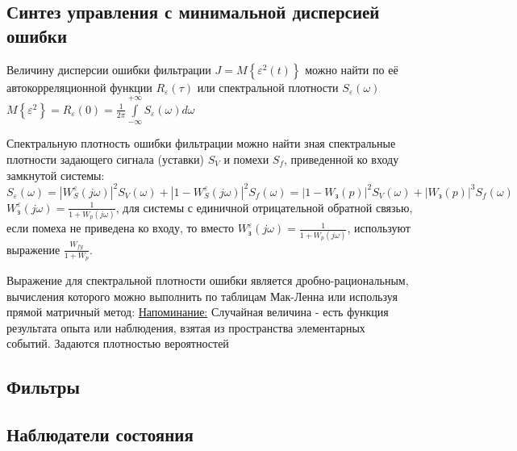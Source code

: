 \documentclass[preprint,russian,a5paper,10pt,twoside,mediummath]{ncc}
\begin{document}
\subsection{Синтез управления с минимальной дисперсией ошибки\label{stochastic:min_error_dispersion}}
Величину дисперсии ошибки фильтрации $J=M\left\{ {{\varepsilon }^{2}}\left( t \right) \right\}$ можно найти по её автокорреляционной функции ${{R}_{\varepsilon }}\left( \tau  \right)$ или спектральной плотности ${{S}_{\varepsilon }}\left( \omega  \right)$
\\$M\left\{ {{\varepsilon }^{2}} \right\}={{R}_{\varepsilon }}\left( 0 \right)=\frac{1}{2\pi }\int\limits_{-\infty }^{+\infty }{{{S}_{\varepsilon }}\left( \omega  \right)d\omega }$
\par Спектральную плотность ошибки фильтрации можно найти зная спектральные плотности задающего сигнала (уставки) ${{S}_{V}}$ и помехи ${{S}_{f}}$, приведенной ко входу замкнутой системы:
${{S}_{\varepsilon }}\left( \omega  \right)={{\left| W_{S}^{\varepsilon }\left( j\omega  \right) \right|}^{2}}{{S}_{V}}\left( \omega  \right)+{{\left| 1-W_{S}^{\varepsilon }\left( j\omega  \right) \right|}^{2}}{{S}_{f}}\left( \omega  \right)={{\left| 1-{{W}_{\textit{з}}}\left( p \right) \right|}^{2}}{{S}_{V}}\left( \omega  \right)+{{\left| {{W}_{\textit{з}}}\left( p \right) \right|}^{3}}{{S}_{f}}\left( \omega  \right)$  
\\$W_{\textit{з}}^{\varepsilon }\left( j\omega  \right)=\frac{1}{1+{{W}_{p}}\left( j\omega  \right)}$, для системы с единичной отрицательной обратной связью, если помеха не приведена ко входу, то вместо $W_{\textit{з}}^{\varepsilon }\left( j\omega  \right)=\frac{1}{1+{{W}_{p}}\left( j\omega  \right)}$, используют выражение $\frac{{{W}_{fy}}}{1+{{W}_{p}}}$.
\par Выражение для спектральной плотности ошибки является дробно-рациональным, вычисления которого можно выполнить по таблицам Мак-Ленна или используя прямой матричный метод:
\underline{Напоминание:} Случайная величина - есть функция результата опыта или наблюдения, взятая из пространства элементарных событий. Задаются плотностью вероятностей   
\subsection{Фильтры\label{stochastic:filters}}
 
\subsection{Наблюдатели состояния\label{stochastic:observers}}
\end{document}
